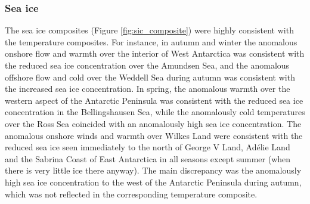 \subsubsection{Sea ice}

The sea ice composites (Figure \ref{fig:sic_composite}) were highly consistent with the temperature composites. For instance, in autumn and winter the anomalous onshore flow and warmth over the interior of West Antarctica was consistent with the reduced sea ice concentration over the Amundsen Sea, and the anomalous offshore flow and cold over the Weddell Sea during autumn was consistent with the increased sea ice concentration. In spring, the anomalous warmth over the western aspect of the Antarctic Peninsula was consistent with the reduced sea ice concentration in the Bellingshausen Sea, while the anomalously cold temperatures over the Ross Sea coincided with an anomalously high sea ice concentration. The anomalous onshore winds and warmth over Wilkes Land were consistent with the reduced sea ice seen immediately to the north of George V Land, Ad{\'e}lie Land and the Sabrina Coast of East Antarctica in all seasons except summer (when there is very little ice there anyway). The main discrepancy was the anomalously high sea ice concentration to the west of the Antarctic Peninsula during autumn, which was not reflected in the corresponding temperature composite.